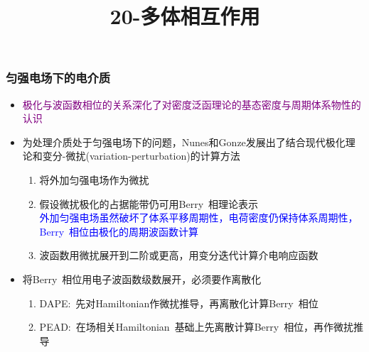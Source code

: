{%
\frame
{
	\frametitle{匀强电场下的电介质}
	\begin{itemize}
		\item \textcolor{purple}{极化与波函数相位的关系深化了对密度泛函理论的基态密度与周期体系物性的认识}
		\item 为处理介质处于匀强电场下的问题，\textrm{Nunes}和\textrm{Gonze}发展出了结合现代极化理论和变分-微扰(\textrm{variation-perturbation})的计算方法%
			\begin{enumerate}
				\item 将外加匀强电场作为微扰
				\item 假设微扰极化的占据能带仍可用\textrm{Berry~}相理论表示\\
					\textcolor{blue}{外加匀强电场虽然破坏了体系平移周期性，电荷密度仍保持体系周期性，\textrm{Berry~}相位由极化的周期波函数计算}
				\item 波函数用微扰展开到二阶或更高，用变分迭代计算介电响应函数
			\end{enumerate}
		\item 将\textrm{Berry~}相位用电子波函数级数展开，必须要作离散化\\
			\begin{enumerate}
				\item \textrm{DAPE}:~先对\textrm{Hamiltonian}作微扰推导，再离散化计算\textrm{Berry~}相位
				\item \textrm{PEAD}:~在场相关\textrm{Hamiltonian~}基础上先离散计算\textrm{Berry~}相位，再作微扰推导
			\end{enumerate}
	\end{itemize}
}

\title{20-多体相互作用}
}
